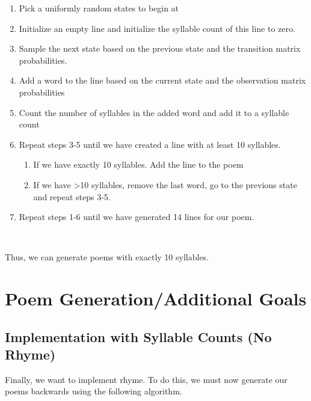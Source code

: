 \begin{enumerate}

\item Pick a uniformly random states to begin at

\item Initialize an empty line and initialize the syllable count of this line to zero.

\item Sample the next state based on the previous state and the transition matrix probabilities.

\item Add a word to the line based on the current state and the observation matrix probabilities

\item Count the number of syllables in the added word and add it to a syllable count

\item Repeat steps 3-5 until we have created a line with at least 10 syllables. 

\begin{enumerate}

\item If we have exactly 10 syllables. Add the line to the poem

\item If we have \textgreater 10 syllables, remove the last word, go to the previous state and repeat steps 3-5.

\end{enumerate}

\item Repeat steps 1-6 until we have generated 14 lines for our poem.

\end{enumerate}
~

Thus, we can generate poems with exactly 10 syllables.

\section*{Poem Generation/Additional Goals}

\subsection*{Implementation with Syllable Counts (No Rhyme)}

Finally, we want to implement rhyme. To do this, we must now generate our poems backwards using the following algorithm. 

